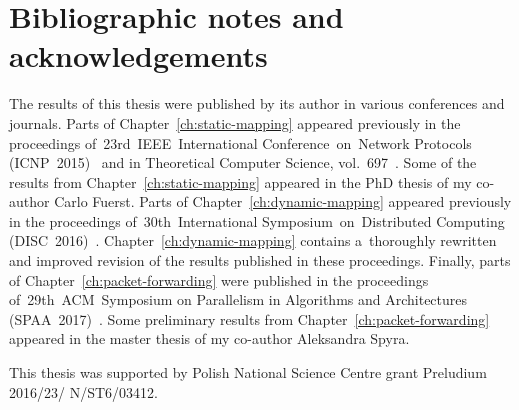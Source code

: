\section{Bibliographic notes and acknowledgements}

The results of this thesis were published by its author in various conferences and journals.
Parts of Chapter~\ref{ch:static-mapping} appeared previously in the proceedings of~23rd~IEEE~International Conference~on~Network Protocols (ICNP~2015)~\cite{my-icnp}
and in Theoretical Computer Science, vol.~697~\cite{my-tcs}.
Some of the results from Chapter~\ref{ch:static-mapping} appeared in the PhD thesis of my co-author Carlo Fuerst.
Parts of Chapter~\ref{ch:dynamic-mapping} appeared previously in the proceedings of~30th~International Symposium~on~Distributed Computing (DISC~2016)~\cite{my-disc}.
Chapter~\ref{ch:dynamic-mapping} contains a~thoroughly rewritten and improved revision of the results published in these proceedings.
Finally, parts of Chapter~\ref{ch:packet-forwarding} were published in the proceedings of~29th~ACM~Symposium on Parallelism in Algorithms and Architectures (SPAA~2017)~\cite{my-spaa}.
Some preliminary results from Chapter~\ref{ch:packet-forwarding} appeared in the master thesis of my co-author Aleksandra Spyra.

This thesis was supported by Polish National Science Centre grant Preludium 2016/23/ N/ST6/03412.

